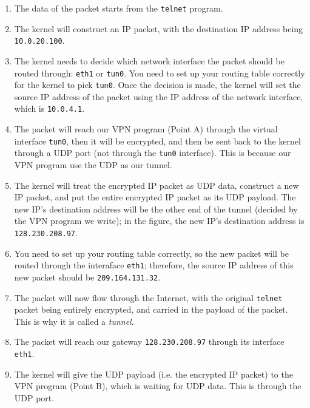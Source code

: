 \begin{enumerate}
\item The data of the packet starts from the {\tt telnet} program. 
\item The kernel will construct an IP packet, with the destination
      IP address being {\tt 10.0.20.100}. 
\item The kernel needs to decide which network interface the packet should 
      be routed through: {\tt eth1} or {\tt tun0}. You need to set up your routing
      table correctly for the kernel to pick {\tt tun0}. Once the decision is 
      made, the kernel will set the source IP address of the packet using
      the IP address of the network interface, which is {\tt 10.0.4.1}.

\item The packet will reach our VPN program (Point A) through the virtual 
      interface {\tt tun0}, then it will be encrypted, and then be sent back
      to the kernel through a UDP port (not through the {\tt tun0} interface).
      This is because our VPN program use the UDP as our tunnel.
      
\item The kernel will treat the encrypted IP packet as UDP data, construct
      a new IP packet, and put the entire encrypted IP packet as its UDP
      payload. The new IP's destination address will be the other end of the
      tunnel (decided by the VPN program we write); in the figure, the 
      new IP's destination address is {\tt 128.230.208.97}.


\item You need to set up your routing table correctly, so the new packet 
      will be routed through the interaface {\tt eth1}; therefore, the 
      source IP address of this new packet should be {\tt 209.164.131.32}.


\item The packet will now flow through the Internet, with the original 
      {\tt telnet} packet being entirely encrypted, and carried in the 
      payload of the packet. This is why it is called a {\em tunnel}.

\item The packet will reach our gateway {\tt 128.230.208.97} through
      its interface {\tt eth1}.


\item The kernel will give the UDP payload (i.e. the encrypted IP packet)
      to the VPN program (Point B), which is waiting for UDP data. 
      This is through the UDP port.



\end{enumerate}
